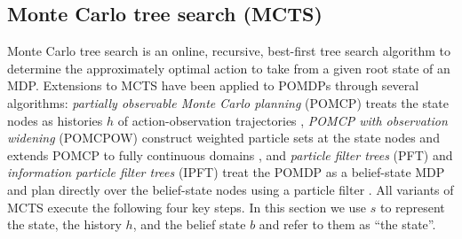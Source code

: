 \subsection{Monte Carlo tree search (MCTS)}
Monte Carlo tree search \cite{coulom2007efficient,browne2012survey} is an online, recursive, best-first tree search algorithm to determine the approximately optimal action to take from a given root state of an MDP.
Extensions to MCTS have been applied to POMDPs through several algorithms: \textit{partially observable Monte Carlo planning} (POMCP) treats the state nodes as histories $h$ of action-observation trajectories \cite{silver2010pomcp}, \textit{POMCP with observation widening} (POMCPOW) construct weighted particle sets at the state nodes and extends POMCP to fully continuous domains \cite{sunberg2018online}, and \textit{particle filter trees} (PFT) and \textit{information particle filter trees} (IPFT) treat the POMDP as a belief-state MDP and plan directly over the belief-state nodes using a particle filter \cite{ fischer2020information}.
All variants of MCTS execute the following four key steps.
In this section we use $s$ to represent the state, the history $h$, and the belief state $b$ and refer to them as ``the state''.


